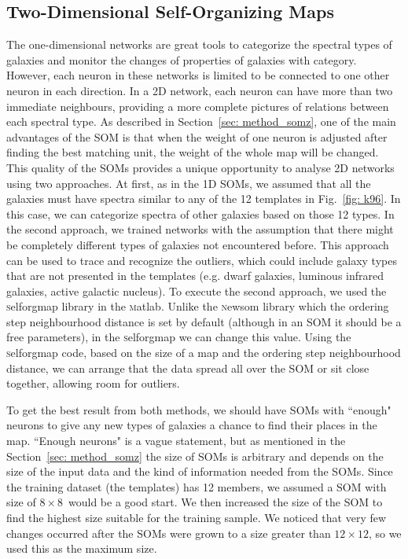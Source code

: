     \subsection{Two-Dimensional Self-Organizing Maps}
    \label{sec: 2D}
    The one-dimensional networks are great tools to categorize the spectral types of galaxies and monitor the changes of properties of galaxies with category.
    However, each neuron in these networks is limited to be connected to one other neuron in each direction.
    In a 2D network, each neuron can have more than two immediate neighbours, providing a more complete pictures of relations between each spectral type.
    As described in Section~\ref{sec: method_somz}, one of the main advantages of the SOM is that when the weight of one neuron is adjusted after finding the best matching unit, the weight of the whole map will be changed.
    This quality of the SOMs provides a unique opportunity to analyse 2D networks using two approaches. 
    At first, as in the 1D SOMs, we assumed that all the galaxies must have spectra similar to any of the 12 templates in Fig.~\ref{fig: k96}.
    In this case, we can categorize spectra of other galaxies based on those 12 types.
    In the second approach, we trained networks with the assumption that there might be completely different types of galaxies not encountered before.
    This approach can be used to trace and recognize the outliers, which could include galaxy types that are not presented in the  templates (e.g. dwarf galaxies, luminous infrared galaxies, active galactic nucleus).
    To execute the second approach, we used the {\textsc selforgmap} library in the {\textsc matlab}.
    Unlike the {\textsc newsom} library which the ordering step neighbourhood distance is set by default (although in an SOM it should be a free parameters), in the {\textsc selforgmap} we can change this value.
    Using the {\textsc selforgmap} code, based on the size of a map and the ordering step neighbourhood distance, we can arrange that the data spread all over the SOM or sit close together, allowing room for outliers.

    To get the best result from both methods, we should have SOMs with ``enough"  neurons to give any new types of galaxies a chance to find their places in the map.
    ``Enough neurons" is a vague statement, but as mentioned in the Section~\ref{sec: method_somz} the size of SOMs is arbitrary and depends on the size of the input data and the kind of information needed from the SOMs.
    Since the training dataset (the  templates) has 12 members, we assumed a SOM with size of $8\times8$~would be a good start.
    We then increased the size of the SOM to find the highest size suitable for the training sample.
    We noticed that very few changes occurred after the SOMs were grown to a size greater than $12\times12$, so we used this as the maximum size.
    
